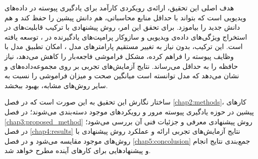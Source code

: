  هدف اصلی این تحقیق، ارائه‌ی رویکردی کارآمد برای یادگیری پیوسته در داده‌های ویدیویی است که بتواند با حداقل منابع محاسباتی، هم دانش پیشین را حفظ کند و هم دانش جدید را بیاموزد. برای تحقق این امر، روش پیشنهادی  با ترکیب قابلیت‌های  در استخراج ویژگی‌های داده‌ی ویدیویی و سازوکار پرامپت‌های یادگیرنده در ، توسعه یافته است. این ترکیب، بدون نیاز به تغییر مستقیم پارامترهای مدل ، امکان تطبیق مدل با وظایف پیوسته را فراهم کرده، مشکل فراموشی فاجعه‌بار را کاهش می‌دهد، نیاز حافظه را به حداقل می‌رساند.
  نتایج آزمایش‌های تجربی بر روی مجموعه‌داده‌های 
 \cite{ucf101} و
 \cite{hmdb51}
 نشان می‌دهد که مدل  توانسته است میانگین صحت و میزان فراموشی را نسبت به سایر روش‌های مشابه، بهبود ببخشد. 

ساختار نگارش این تحقیق به این صورت است که در فصل \ref{chap2:methods}، کارهای پیشین در حوزه یادگیری پیوسته مرور و رویکردهای موجود دسته‌بندی می‌شوند؛ در فصل \ref{chap3:proposed_method} روش پیشنهادی معرفی و جزئیات فنی آن بررسی می‌شود؛ در فصل \ref{chap4:results} نتایج آزمایش‌های تجربی ارائه و عملکرد روش پیشنهادی با روش‌های موجود مقایسه می‌شود و در فصل \ref{chap5:concolusion} جمع‌بندی نتایج انجام و پیشنهادهایی برای کارهای آینده مطرح خواهد شد.
























